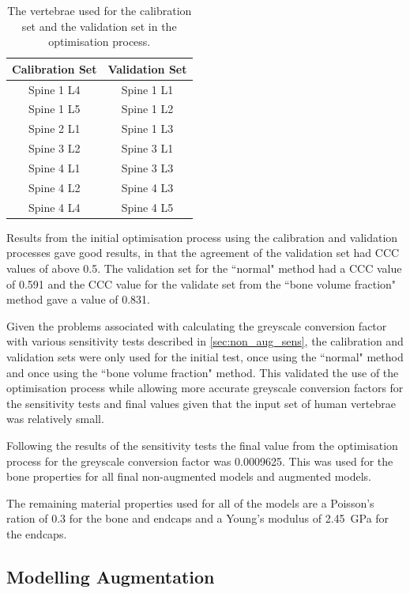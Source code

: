 \begin{table}[ht!]
	\caption{The vertebrae used for the calibration set and the validation set in
the optimisation process.}
	\label{tab:calib_valid}
	\centering
	\begin{tabular}{c|c}
    Calibration Set   & Validation Set  \\ \hline \hline
    Spine 1 L4 & Spine 1 L1  \\
    Spine 1 L5 & Spine 1 L2\\
    Spine 2 L1 & Spine 1 L3 \\
    Spine 3 L2 & Spine 3 L1\\
    Spine 4 L1 & Spine 3 L3\\
    Spine 4 L2 & Spine 4 L3\\
    Spine 4 L4 & Spine 4 L5 \\
    \hline
	\end{tabular}
\end{table}


Results from the initial optimisation process using the calibration and
validation processes gave good results, in that the agreement of the validation
set had CCC values of above 0.5.
The validation set for the ``normal" method had a CCC value of 0.591 and the
CCC value for the validate set from the ``bone volume fraction" method gave a
value of 0.831.

Given the problems associated with calculating the greyscale conversion factor
with various sensitivity tests described in \cref{sec:non_aug_sens}, the
calibration and validation sets were only used for the initial test, once using
the ``normal" method and once using the ``bone volume fraction" method.
This validated the use of the optimisation process while allowing more accurate
greyscale conversion factors for the sensitivity tests and final values given
that the input set of human vertebrae was relatively small.

Following the results of the sensitivity tests the final value from the
optimisation process for the greyscale conversion factor was 0.0009625.
This was used for the bone properties for all final non-augmented models and
augmented models.

The remaining material properties used for all of the models are a Poisson's
ration of 0.3 for the bone and endcaps and a Young's modulus of 2.45~GPa for
the endcaps. 

\subsection{Modelling Augmentation}

